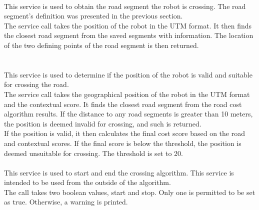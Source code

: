         \\
            This service is used to obtain the road segment the robot is crossing. The road segment's definition was presented in the previous section.\\
            The service call takes the position of the robot in the UTM format. It then finds the closest road segment from the saved segments with information. The location of the two defining points of the road segment is then returned.\\\\
        \\
            This service is used to determine if the position of the robot is valid and suitable for crossing the road.\\
            The service call takes the geographical position of the robot in the UTM format and the contextual score. It finds the closest road segment from the road cost algorithm results. If the distance to any road segments is greater than 10 meters, the position is deemed invalid for crossing, and such is returned.\\
            If the position is valid, it then calculates the final cost score based on the road and contextual scores. If the final score is below the threshold, the position is deemed unsuitable for crossing. The threshold is set to 20.\\
        \\
            This service is used to start and end the crossing algorithm. This service is intended to be used from the outside of the algorithm.\\
            The call takes two boolean values, start and stop. Only one is permitted to be set as true. Otherwise, a warning is printed.

